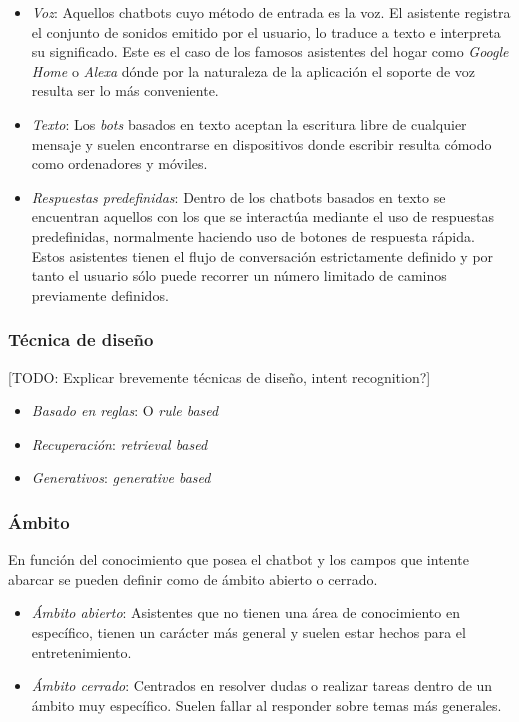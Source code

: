 \begin{itemize}
	\item \textit{Voz}: Aquellos chatbots cuyo método de entrada es la voz. El asistente registra el conjunto de sonidos emitido por el usuario, lo traduce a texto e interpreta su significado. Este es el caso de los famosos asistentes del hogar como \textit{Google Home} o \textit{Alexa} dónde por la naturaleza de la aplicación el soporte de voz resulta ser lo más conveniente.
	\item \textit{Texto}: Los \textit{bots} basados en texto aceptan la escritura libre de cualquier mensaje y suelen encontrarse en dispositivos donde escribir resulta cómodo como ordenadores y móviles.
	\item \textit{Respuestas predefinidas}: Dentro de los chatbots basados en texto se encuentran aquellos con los que se interactúa mediante el uso de respuestas predefinidas, normalmente haciendo uso de botones de respuesta rápida. Estos asistentes tienen el flujo de conversación estrictamente definido y por tanto el usuario sólo puede recorrer un número limitado de caminos previamente definidos.
\end{itemize}



\subsubsection{Técnica de diseño}
[TODO: Explicar brevemente técnicas de diseño, intent recognition?]
\begin{itemize}
	\item \textit{Basado en reglas}: O \textit{rule based}
	\item \textit{Recuperación}: \textit{retrieval based}
	\item \textit{Generativos}: \textit{generative based} 
\end{itemize}

\subsubsection{Ámbito}
En función del conocimiento que posea el chatbot y los campos que intente abarcar se pueden definir como de ámbito abierto o cerrado.

\begin{itemize}
	\item \textit{Ámbito  abierto}: Asistentes que no tienen una área de conocimiento en específico, tienen un carácter más general y suelen estar hechos para el entretenimiento.
	\item \textit{Ámbito cerrado}: Centrados en resolver dudas o realizar tareas dentro de un ámbito muy específico. Suelen  fallar al responder sobre temas más generales.
\end{itemize}


